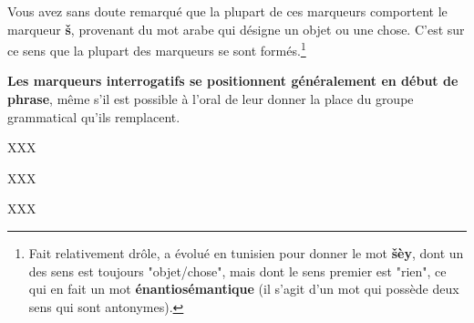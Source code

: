 Vous avez sans doute remarqué que la plupart de ces marqueurs comportent le marqueur \textbf{\v{s}}, provenant du mot arabe  qui désigne un objet ou une chose. C'est sur ce sens que la plupart des marqueurs se sont formés.\footnote{Fait relativement drôle,  a évolué en tunisien pour donner le mot \textbf{\v{s}èy}, dont un des sens est toujours "objet/chose", mais dont le sens premier est "rien", ce qui en fait un mot \textbf{énantiosémantique} (il s'agit d'un mot qui possède deux sens qui sont antonymes).}

\textbf{Les marqueurs interrogatifs se positionnent généralement en début de phrase}, même s'il est possible à l'oral de leur donner la place du groupe grammatical qu'ils remplacent.

XXX

XXX

XXX
